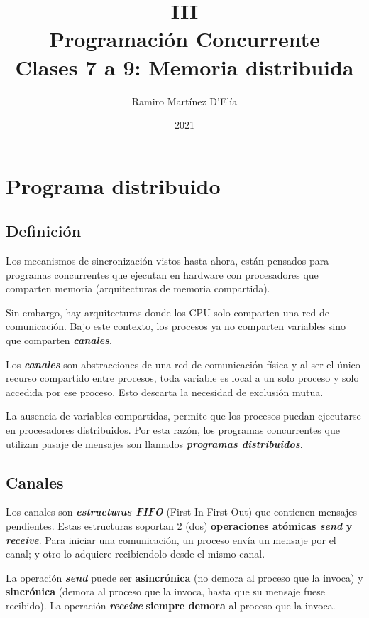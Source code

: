 \documentclass[a4paper, 10pt]{report}
\begin{document}
\title{
	III\\
	Programación Concurrente\\
	\large Clases 7 a 9: Memoria distribuida
}
\author{Ramiro Martínez D'Elía}
\date{2021}
\maketitle

\tableofcontents

\chapter{Programa distribuido}

\section{Definición}

Los mecanismos de sincronización vistos hasta ahora, están pensados para programas concurrentes que ejecutan en hardware con procesadores que comparten memoria (arquitecturas de memoria compartida).

Sin embargo, hay arquitecturas donde los CPU solo comparten una red de comunicación. Bajo este contexto, los procesos ya no comparten variables sino que comparten \textbf{\emph{canales}}.

Los \textbf{\emph{canales}} son abstracciones de una red de comunicación física y al ser el único recurso compartido entre procesos, toda variable es local a un solo proceso y solo accedida por ese proceso. Esto descarta la necesidad de exclusión mutua.

La ausencia de variables compartidas, permite que los procesos puedan ejecutarse en procesadores distribuidos. Por esta razón, los programas concurrentes que utilizan pasaje de mensajes son llamados \textbf{\emph{programas distribuidos}}.

\section{Canales}

Los canales son \textbf{\emph{estructuras FIFO}} (First In First Out) que contienen mensajes pendientes. Estas estructuras soportan 2 (dos) \textbf{operaciones atómicas \emph{send} y \emph{receive}}. Para iniciar una comunicación, un proceso envía un mensaje por el canal; y otro lo adquiere recibiendolo desde el mismo canal.

La operación \textbf{\emph{send}} puede ser \textbf{asincrónica} (no demora al proceso que la invoca) y \textbf{sincrónica} (demora al proceso que la invoca, hasta que su mensaje fuese recibido). La operación \textbf{\emph{receive}} \textbf{siempre demora} al proceso que la invoca.
\end{document}
